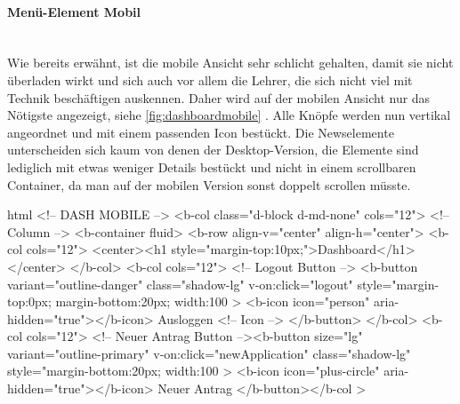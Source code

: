 \paragraph{Menü-Element Mobil}
~\\
Wie bereits erwähnt, ist die mobile Ansicht sehr schlicht gehalten, damit sie nicht überladen wirkt und sich auch vor allem die Lehrer, die sich nicht viel mit Technik beschäftigen auskennen. Daher wird auf der mobilen Ansicht nur das Nötigste angezeigt, siehe \autoref{fig:dashboardmobile} . Alle Knöpfe werden nun vertikal angeordnet und mit einem passenden Icon bestückt. Die Newselemente unterscheiden sich kaum von denen der Desktop-Version, die Elemente sind lediglich mit etwas weniger Details bestückt und nicht in einem scrollbaren Container, da man auf der mobilen Version sonst doppelt scrollen müsste.
\begin{code}{html}
	<!-- DASH MOBILE -->
	<b-col class="d-block d-md-none" cols="12">
	  <!-- Column -->
	  <b-container fluid>
		<b-row align-v="center" align-h="center">
		  <b-col cols="12">
			<center><h1 style="margin-top:10px;">Dashboard</h1></center>
		  </b-col>
		  <b-col cols="12">
			<!-- Logout Button -->
			<b-button
			  variant="outline-danger"
			  class="shadow-lg"
			  v-on:click="logout"
			  style="margin-top:0px; margin-bottom:20px; width:100%
			>
			  <b-icon icon="person" aria-hidden="true"></b-icon> Ausloggen
			  <!-- Icon -->
			</b-button>
		  </b-col>
		  <b-col cols="12">
			<!-- Neuer Antrag Button --><b-button
			  size="lg"
			  variant="outline-primary"
			  v-on:click="newApplication"
			  class="shadow-lg"
			  style="margin-bottom:20px; width:100%
			>
			  <b-icon icon="plus-circle" aria-hidden="true"></b-icon> Neuer
			  Antrag
			</b-button></b-col
		  >	
\end{code}
	\label{list:startmobile} ~\\
